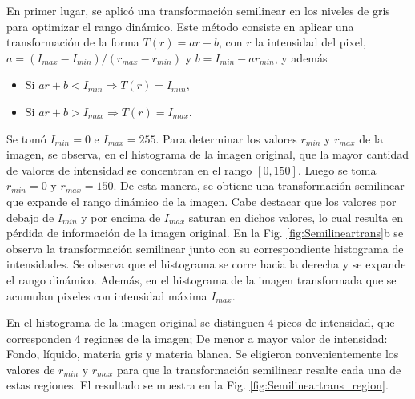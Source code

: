 \documentclass[letterpaper,12pt]{article}
\theoremstyle{plain}
\begin{document}
En primer lugar, se aplicó una transformación semilinear en los niveles de gris para optimizar el rango dinámico. Este método consiste en aplicar una transformación de la forma $T(r) = a r + b$, con $r$ la intensidad del pixel, $a = (I_{max} - I_{min})/(r_{max}-r_{min})$ y $b=I_{min} - ar_{min}$, y además
\begin{itemize}
    \item Si $a r + b < I_{min} \Rightarrow T(r)=I_{min}$,
    \item Si $a r + b > I_{max} \Rightarrow T(r)=I_{max}$.
\end{itemize}
Se tomó $I_{min}=0$ e $I_{max}=255$. Para determinar los valores $r_{min}$ y $r_{max}$ de la imagen, se observa, en el histograma de la imagen original, que la mayor cantidad de valores de intensidad se concentran en el rango $[0, 150]$. Luego se toma $r_{min}=0$ y $r_{max}=150$. De esta manera, se obtiene una transformación semilinear que expande el rango dinámico de la imagen. Cabe destacar que los valores por debajo de $I_{min}$ y por encima de $I_{max}$ saturan en dichos valores, lo cual resulta en pérdida de información de la imagen original. En la Fig. \ref{fig:Semilineartrans}b se observa la transformación semilinear junto con su correspondiente histograma de intensidades. Se observa que el histograma se corre hacia la derecha y se expande el rango dinámico. Además, en el histograma de la imagen transformada que se acumulan pixeles con intensidad máxima $I_{max}$.

En el histograma de la imagen original se distinguen 4 picos de intensidad, que corresponden 4 regiones de la imagen; De menor a mayor valor de intensidad: Fondo, líquido, materia gris y materia blanca. Se eligieron convenientemente los valores de $r_{min}$ y $r_{max}$ para que la transformación semilinear resalte cada una de estas regiones. El resultado se muestra en la Fig. \ref{fig:Semilineartrans_region}.
\end{document}
